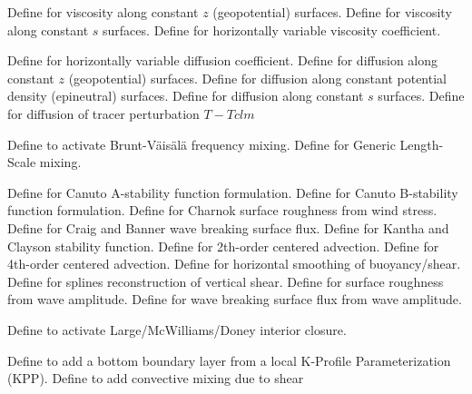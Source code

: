 \begin{klist}
   \mbox{}
  \begin{klist}
       Define for viscosity along constant $z$
   (geopotential) surfaces.
       Define for viscosity along constant $s$
   surfaces.
        Define for horizontally variable viscosity
     coefficient.
  \end{klist}
   \mbox{}
  \begin{klist}
        Define for horizontally variable diffusion
     coefficient.
       Define for diffusion along constant $z$
   (geopotential) surfaces.
       Define for diffusion along constant potential
   density (epineutral) surfaces.
       Define for diffusion along constant $s$
   surfaces.
       Define for diffusion of tracer perturbation
     $T-Tclm$
  \end{klist}
   \mbox{}
  \begin{klist}
       Define to activate Brunt-V\"ais\"al\"a
   frequency mixing.
       Define for Generic Length-Scale mixing.
    \begin{klist}
         Define for Canuto A-stability function
       formulation.
         Define for Canuto B-stability function
       formulation.
         Define for Charnok surface roughness from wind
       stress.
         Define for Craig and Banner wave breaking
       surface flux.
         Define for Kantha and Clayson stability
       function.
         Define for 2th-order centered advection.
         Define for 4th-order centered advection.
         Define for horizontal smoothing of
       buoyancy/shear.
         Define for splines reconstruction of
       vertical shear.
         Define for surface roughness from wave
       amplitude.
         Define for wave breaking surface flux from
       wave amplitude.
    \end{klist}
       Define to activate Large/McWilliams/Doney
   interior closure.
    \begin{klist}
       Define to add a bottom boundary layer from a local
   K-Profile Parameterization (KPP).
       Define to add convective mixing due to shear

\end{klist}
\end{klist}
\end{klist}
